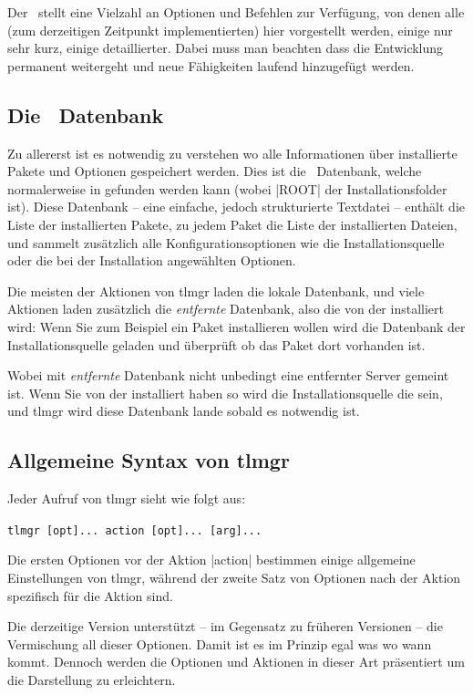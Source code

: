 Der \tlmgr\ stellt eine Vielzahl an Optionen und Befehlen zur Verfügung, von
denen alle (zum derzeitigen Zeitpunkt implementierten) hier vorgestellt
werden, einige nur sehr kurz, einige detaillierter. Dabei muss man beachten
dass die Entwicklung permanent weitergeht und neue Fähigkeiten laufend
hinzugefügt werden.

\subsection{Die \tl\ Datenbank}

Zu allererst ist es notwendig zu verstehen wo alle Informationen über
installierte Pakete und Optionen gespeichert werden. Dies ist die
\tl\ Datenbank, welche normalerweise in 
gefunden werden kann (wobei |ROOT| der Installationsfolder ist).
Diese Datenbank -- eine einfache, jedoch strukturierte Textdatei --
enthält die Liste der installierten Pakete, zu jedem Paket die Liste
der installierten Dateien, und sammelt zusätzlich alle
Konfigurationsoptionen wie die Installationsquelle oder die bei der
Installation angewählten Optionen.

Die meisten der Aktionen von tlmgr laden die lokale Datenbank, und viele
Aktionen laden zusätzlich die \emph{entfernte} Datenbank, also die
von der installiert wird: Wenn Sie zum Beispiel ein Paket installieren
wollen wird die Datenbank der Installationsquelle geladen und überprüft
ob das Paket dort vorhanden ist.

Wobei mit \emph{entfernte} Datenbank nicht unbedingt eine entfernter
Server gemeint ist. Wenn Sie von der  installiert haben so
wird die Installationsquelle die  sein, und tlmgr wird diese
Datenbank lande sobald es notwendig ist.

\subsection{Allgemeine Syntax von tlmgr}

Jeder Aufruf von tlmgr sieht wie folgt aus:
\begin{center}
  \Verb+tlmgr [opt]... action [opt]... [arg]...+
\end{center}
Die ersten Optionen vor der Aktion |action| bestimmen einige allgemeine
Einstellungen von tlmgr, während der zweite Satz von Optionen nach der
Aktion spezifisch für die Aktion sind.

Die derzeitige Version unterstützt -- im Gegensatz zu früheren Versionen --
die Vermischung all dieser Optionen. Damit ist es im Prinzip egal was
wo wann kommt. Dennoch werden die Optionen und Aktionen in dieser
Art präsentiert um die Darstellung zu erleichtern.

